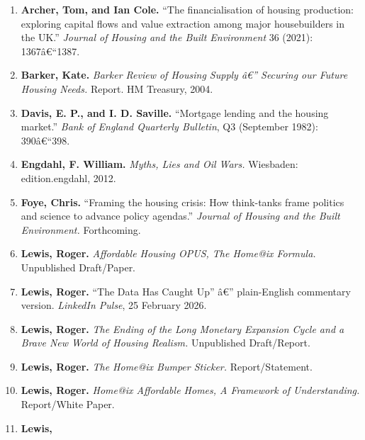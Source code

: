 \begin{enumerate}
\def\labelenumi{\arabic{enumi}.}
\tightlist
\item
  \protect{}\label{ref-archer2021}{\textbf{Archer, Tom, and
  Ian Cole.} ``The financialisation of housing production: exploring
  capital flows and value extraction among major housebuilders in the
  UK.'' \emph{Journal of Housing and the Built Environment} 36 (2021):
  1367â€``1387.}
\item
  \protect{}\label{ref-barker2004}{\textbf{Barker, Kate.}
  \emph{Barker Review of Housing Supply â€'' Securing our Future Housing
  Needs.} Report. HM Treasury, 2004.}
\item
  \protect{}\label{ref-davis1982}{\textbf{Davis, E. P., and
  I. D. Saville.} ``Mortgage lending and the housing market.''
  \emph{Bank of England Quarterly Bulletin}, Q3 (September 1982):
  390â€``398.}
\item
  \protect{}\label{ref-engdahl2012}{\textbf{Engdahl, F.
  William.} \emph{Myths, Lies and Oil Wars.} Wiesbaden: edition.engdahl,
  2012.}
\item
  \protect{}\label{ref-foye-forthcoming}{\textbf{Foye,
  Chris.} ``Framing the housing crisis: How think-tanks frame politics
  and science to advance policy agendas.'' \emph{Journal of Housing and
  the Built Environment.} Forthcoming.}
\item
  \protect{}\label{ref-lewis-opus}{\textbf{Lewis, Roger.}
  \emph{Affordable Housing OPUS, The Home@ix Formula.} Unpublished
  Draft/Paper.}
\item
  \protect{}\label{ref-lewis-linkedin-data}{\textbf{Lewis,
  Roger.} ``The Data Has Caught Up'' â€'' plain-English commentary
  version. \emph{LinkedIn Pulse}, 25 February 2026.}
\item
  \protect{}\label{ref-lewis-monetary}{\textbf{Lewis,
  Roger.} \emph{The Ending of the Long Monetary Expansion Cycle and a
  Brave New World of Housing Realism.} Unpublished Draft/Report.}
\item
  \protect{}\label{ref-lewis-bumper}{\textbf{Lewis, Roger.}
  \emph{The Home@ix Bumper Sticker.} Report/Statement.}
\item
  \protect{}\label{ref-lewis-framework}{\textbf{Lewis,
  Roger.} \emph{Home@ix Affordable Homes, A Framework of Understanding.}
  Report/White Paper.}
\item
  \protect{}\label{ref-lewis-linkedin-credit}{\textbf{Lewis,
}}
\end{enumerate}

